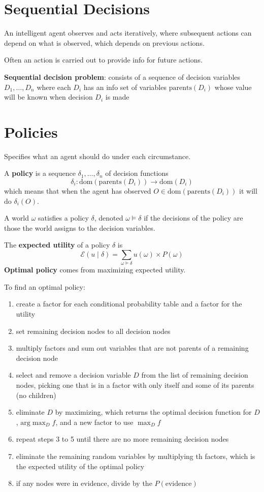 \documentclass[11pt]{article}
\begin{document}
\section{Sequential Decisions}
\label{sec:orgffaa563}
An intelligent agent observes and acts iteratively, where subsequent
actions can depend on what is observed, which depends on previous actions.

Often an action is carried out to provide info for future actions.

\textbf{Sequential decision problem}: consists of a sequence of decision variables
\(D_{1}, \dots, D_{n}\) where each \(D_{i}\) has an info set of variables
\(\text{parents}(D_{i})\) whose value will be known when decision \(D_{i}\)
is made
\section{Policies}
\label{sec:org689708e}
Specifies what an agent should do under each circumstance.

A \textbf{policy} is a sequence \(\delta_{1}, \dots, \delta_{n}\) of decision functions
$$ \delta_{i} : \text{dom}(\text{parents}(D_{i})) \to \text{dom}(D_{i}) $$
which means that when the agent has observed \(O \in \text{dom}(\text{parents}(D_{i}))\)
it will do \(\delta_{i}(O)\).

A world \(\omega\) satisfies a policy \(\delta\), denoted \(\omega \models \delta\) if the
decisions of the policy are those the world assigns to the decision variables.

The \textbf{expected utility} of a policy \(\delta\) is
$$ \mathcal{E} ( u \mid \delta ) = \sum_{\omega \models \delta} u(\omega) \times P(\omega) $$
\textbf{Optimal policy} comes from maximizing expected utility.

To find an optimal policy:
\begin{enumerate}
\item create a factor for each conditional probability table and a factor for the utility
\item set remaining decision nodes to all decision nodes
\item multiply factors and sum out variables that are not parents of a remaining decision node
\item select and remove a decision variable \(D\) from the list of remaining decision nodes,
picking one that is in a factor with only itself and some of its parents (no children)
\item eliminate \(D\) by maximizing, which returns the optimal decision function for \(D\),
\(\text{arg} \max_{D} f\), and a new factor to use \(\max_{D} f\)
\item repeat steps 3 to 5 until there are no more remaining decision nodes
\item eliminate the remaining random variables by multiplying th factors, which is the
expected utility of the optimal policy
\item if any nodes were in evidence, divide by the \(P(\text{evidence})\)
\end{enumerate}
\end{document}
